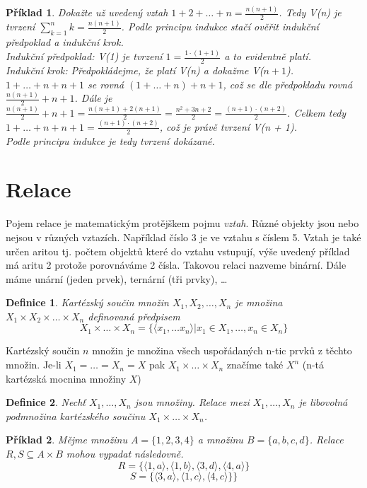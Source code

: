 \documentclass[12pt,a4paper]{article}
\newtheorem{definition}{Definice}
\newtheorem{example}{Příklad}
\begin{document}
\begin{example}
	Dokažte už uvedený vztah $1 + 2 + \dots + n = \frac{n(n+1)}{2}$. Tedy V(n) je tvrzení $\sum^n_{k=1} k =  \frac{n(n+1)}{2}$. Podle principu indukce stačí ověřit indukční předpoklad a indukční krok. \\[6pt]
	Indukční předpoklad: V(1) je tvrzení $1 = \frac{1 \cdot (1 + 1)}{2}$ a to evidentně platí.\\[6pt]
	Indukční krok: Předpokládejme, že platí V(n) a dokažme V($n + 1$). $1 + \dots + n + n + 1$ se rovná  $(1 + \dots + n) + n + 1$, což se dle předpokladu rovná $\frac{n(n + 1)}{2} + n + 1$. Dále je $\frac{n(n + 1)}{2} + n + 1 = \frac{n(n + 1) + 2(n + 1)}{2} = \frac{n^2 + 3n + 2}{2} = \frac{(n + 1) \cdot (n + 2)}{2}$. Celkem tedy $1 + \dots + n + n + 1 =  \frac{(n + 1) \cdot (n + 2)}{2}$, což je právě tvrzení V(n + 1).\\[6pt]
	Podle principu indukce je tedy tvrzení dokázané.
\end{example}

\section{Relace}
Pojem relace je matematickým protějškem pojmu \textit{vztah}. Různé objekty jsou nebo nejsou v různých vztazích. Například číslo 3 je ve vztahu  s číslem 5. Vztah je také určen aritou tj. počtem objektů které do vztahu vstupují, výše uvedený příklad má aritu 2 protože porovnáváme 2 čísla. Takovou relaci nazveme binární. Dále máme unární (jeden prvek), ternární (tři prvky), \dots

\begin{definition}
Kartézský součin množin $X_1, X_2, \dots,X_n$ je množina $X_1 \times X_2 \times \dots \times X_n$ definovaná předpisem $$X_1 \times \dots \times X_n =  \{\langle x_1, \dots x_n \rangle | x_1 \in X_1, \dots, x_n \in X_n\} $$
\end{definition}
 Kartézský součin $n$ množin je množina všech uspořádaných n-tic prvků z těchto množin. Je-li $X_1 = \dots = X_n = X$ pak $X_1 \times \dots \times X_n$ značíme také $X^n$ (n-tá kartézská mocnina množiny $X$)

\begin{definition}
Nechť $X_1, \dots,X_n$ jsou množiny. Relace mezi $X_1, \dots,X_n$ je libovolná podmnožina kartézského součinu $X_1 \times \dots \times X_n $.
\end{definition}

\begin{example}
Mějme množinu $A = \{1,2,3,4\}$ a množinu $B = \{a,b,c,d\}$. Relace $R,S \subseteq A \times B$ mohou vypadat následovně. $$R = \{\langle 1, a\rangle, \langle 1, b\rangle, \langle 3, d\rangle, \langle 4, a\rangle\}$$
$$S = \{\langle 3, a\rangle, \langle 1, c\rangle,  \langle 4, c\rangle\}\}$$
\end{example}
\end{document}
